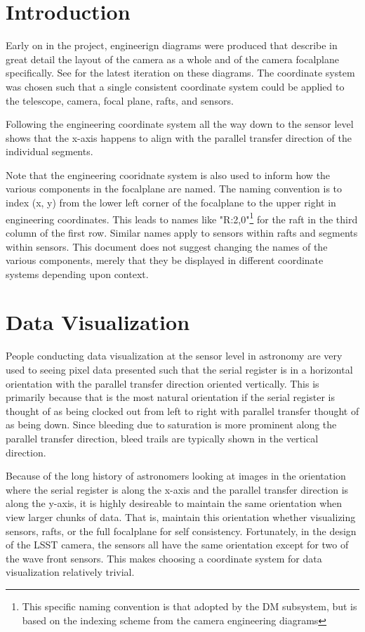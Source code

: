 \section{Introduction} \label{sec:intro}
Early on in the project, engineerign diagrams were produced that describe in great detail the layout of the camera as a whole and of the camera focalplane specifically. See  for the latest iteration on these diagrams. The coordinate system was chosen such that a single consistent coordinate system could be applied to the telescope, camera, focal plane, rafts, and sensors.

Following the engineering coordinate system all the way down to the sensor level shows that the x-axis happens to align with the parallel transfer direction of the individual segments.

Note that the engineering cooridnate system is also used to inform how the various components in the focalplane are named. The naming convention is to index (x, y) from the lower left corner of the focalplane to the upper right in engineering coordinates. This leads to names like "R:2,0"\footnote{This specific naming convention is that adopted by the DM subsystem, but is based on the indexing scheme from the camera engineering diagrams} for the raft in the third column of the first row. Similar names apply to sensors within rafts and segments within sensors. This document does not suggest changing the names of the various components, merely that they be displayed in different coordinate systems depending upon context.

\section{Data Visualization}
People conducting data visualization at the sensor level in astronomy are very used to seeing pixel data presented such that the serial register is in a horizontal orientation with the parallel transfer direction oriented vertically. This is primarily because that is the most natural orientation if the serial register is thought of as being clocked out from left to right with parallel transfer thought of as being down. Since bleeding due to saturation is more prominent along the parallel transfer direction, bleed trails are typically shown in the vertical direction.

Because of the long history of astronomers looking at images in the orientation where the serial register is along the x-axis and the parallel transfer direction is along the y-axis, it is highly desireable to maintain the same orientation when view larger chunks of data. That is, maintain this orientation whether visualizing sensors, rafts, or the full focalplane for self consistency. Fortunately, in the design of the LSST camera, the sensors all have the same orientation except for two of the wave front sensors. This makes choosing a coordinate system for data visualization relatively trivial.

